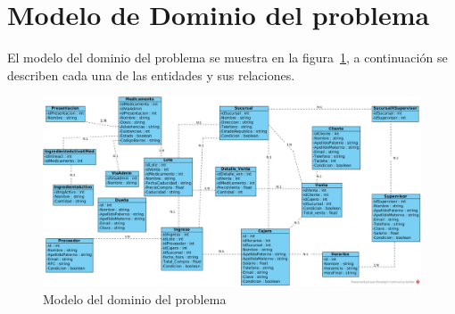 \section{Modelo de Dominio del problema}

	El modelo del dominio del problema se muestra en la figura~\ref{fig:modeloDeDominio}, a continuación se describen cada una de las entidades y sus relaciones.
	
\begin{figure}[htbp!]
	\begin{center}
		\includegraphics[width=\textwidth]{images/diagramaRelacional}
		\caption{Modelo del dominio del problema}
		\label{fig:modeloDeDominio}
	\end{center}
\end{figure}

\newpage

\newenvironment{cdtEntidad}[2]{%
	\def \varBusinessEntityId{#2}%
	\hypertarget{#1}{\hspace{1pt}}%
	\newline%
	\noindent{\texttt{[image: images/uc/classRule]}}%
	\vspace{-25pt}%
	\subsection{Entidad: #2}%
	\noindent\begin{longtable}{|p{.2\textwidth}| p{.15\textwidth} | p{.46\textwidth} |p{.08\textwidth} |}%
	\hline%
	\multicolumn{4}{|c|}{{\cellcolor{colorSecundario}\color{white}Atributos}}\\ \hline%
	{\cellcolor{colorAgua}Nombre} &%
	{\cellcolor{colorAgua}Tipo} &%
	{\cellcolor{colorAgua}Descripción} &%
	{\cellcolor{colorAgua}Requerido}%
	\\ \hline%
	\endhead%
}{%
	\end{longtable}%
}

